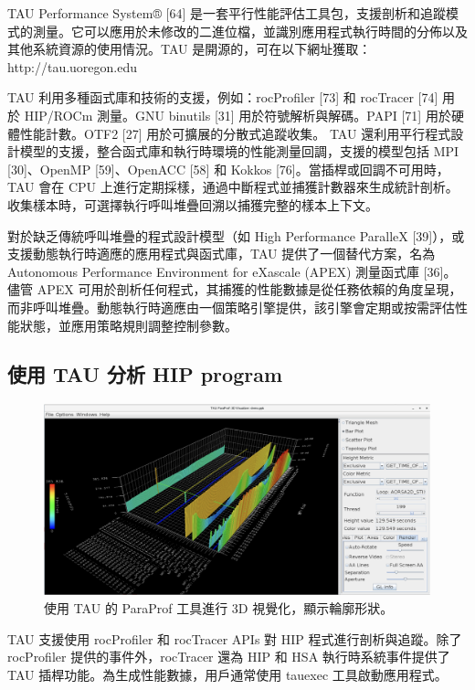 TAU Performance System® [64] 是一套平行性能評估工具包，支援剖析和追蹤模式的測量。它可以應用於未修改的二進位檔，並識別應用程式執行時間的分佈以及其他系統資源的使用情況。TAU 是開源的，可在以下網址獲取：
http://tau.uoregon.edu

TAU 利用多種函式庫和技術的支援，例如：rocProfiler [73] 和 rocTracer [74] 用於 HIP/ROCm 測量。GNU binutils [31] 用於符號解析與解碼。PAPI [71] 用於硬體性能計數。OTF2 [27] 用於可擴展的分散式追蹤收集。
TAU 還利用平行程式設計模型的支援，整合函式庫和執行時環境的性能測量回調，支援的模型包括 MPI [30]、OpenMP [59]、OpenACC [58] 和 Kokkos [76]。當插桿或回調不可用時，TAU 會在 CPU 上進行定期採樣，通過中斷程式並捕獲計數器來生成統計剖析。收集樣本時，可選擇執行呼叫堆疊回溯以捕獲完整的樣本上下文。

對於缺乏傳統呼叫堆疊的程式設計模型（如 High Performance ParalleX [39]），或支援動態執行時適應的應用程式與函式庫，TAU 提供了一個替代方案，名為 Autonomous Performance Environment for eXascale (APEX) 測量函式庫 [36]。儘管 APEX 可用於剖析任何程式，其捕獲的性能數據是從任務依賴的角度呈現，而非呼叫堆疊。動態執行時適應由一個策略引擎提供，該引擎會定期或按需評估性能狀態，並應用策略規則調整控制參數。

\subsection{使用 TAU 分析 HIP program}

\begin{figure}
    \centering
    \includegraphics[width=0.9\linewidth]{FileAusiliari/Screenshots/Figure13-16.png}
    \caption{使用 TAU 的 ParaProf 工具進行 3D 視覺化，顯示輪廓形狀。}
    \label{fig:PAPI16}
\end{figure}

TAU 支援使用 rocProfiler 和 rocTracer APIs 對 HIP 程式進行剖析與追蹤。除了 rocProfiler 提供的事件外，rocTracer 還為 HIP 和 HSA 執行時系統事件提供了 TAU 插桿功能。為生成性能數據，用戶通常使用 tauexec 工具啟動應用程式。

